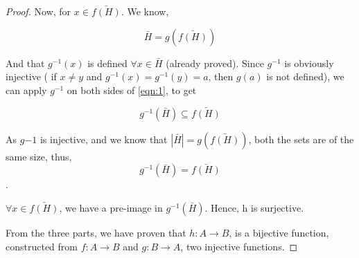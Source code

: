 \begin{proof}
Now, for $x \in \bar{f(H)}$. We know,

\begin{equation} \label{eqn:1} \bar H = g(\bar{f(H)}) \end{equation}

And that $g^{-1}(x)$ is defined $\forall x \in \bar H$ (already proved). Since $g^{-1}$ is obviously injective ( if $x \ne y$ and  $g^{-1}(x) = g^{-1}(y) = a$, then $g(a)$ is not defined), we can apply $g^{-1}$ on both sides of \ref{eqn:1}, to get 

$$ g^{-1}(\bar{H}) \subseteq \bar{f(H)}$$

As $g{-1}$ is injective, and we know that $|\bar H| = g(\bar{f(H)})$, both the sets are of the same size, thus,
$$ g^{-1}(\bar H) = \bar{f(H)}$$.

$\forall x \in \bar{f(H)}$, we have a pre-image in $g^{-1}(\bar H)$. Hence, h is surjective.

From the three parts, we have proven that $h : A \to B$, is a bijective function, constructed from $f : A \to B$ and $g : B \to A$, two injective functions.

\end{proof}
